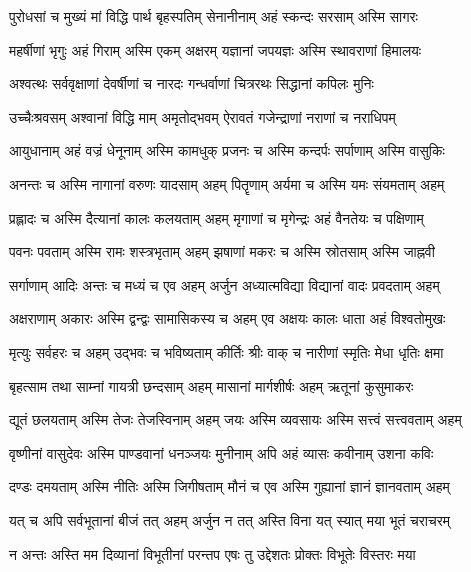 \twolineshloka
{पुरोधसां च मुख्यं मां विद्धि पार्थ बृहस्पतिम्}
{सेनानीनाम् अहं स्कन्दः सरसाम् अस्मि सागरः}%

\twolineshloka
{महर्षीणां भृगुः अहं गिराम् अस्मि एकम् अक्षरम्}
{यज्ञानां जपयज्ञः अस्मि स्थावराणां हिमालयः}%

\twolineshloka
{अश्वत्थः सर्ववृक्षाणां देवर्षीणां च नारदः}
{गन्धर्वाणां चित्ररथः सिद्धानां कपिलः मुनिः}%

\twolineshloka
{उच्चैःश्रवसम् अश्वानां विद्धि माम् अमृतोद्भवम्}
{ऐरावतं गजेन्द्राणां नराणां च नराधिपम्}%

\twolineshloka
{आयुधानाम् अहं वज्रं धेनूनाम् अस्मि कामधुक्}
{प्रजनः च अस्मि कन्दर्पः सर्पाणाम् अस्मि वासुकिः}%

\twolineshloka
{अनन्तः च अस्मि नागानां वरुणः यादसाम् अहम्}
{पितॄणाम् अर्यमा च अस्मि यमः संयमताम् अहम्}%

\twolineshloka
{प्रह्लादः च अस्मि दैत्यानां कालः कलयताम् अहम्}
{मृगाणां च मृगेन्द्रः अहं वैनतेयः च पक्षिणाम्}%

\twolineshloka
{पवनः पवताम् अस्मि रामः शस्त्रभृताम् अहम्}
{झषाणां मकरः च अस्मि स्रोतसाम् अस्मि जाह्नवी}%

\twolineshloka
{सर्गाणाम् आदिः अन्तः च मध्यं च एव अहम् अर्जुन}
{अध्यात्मविद्या विद्यानां वादः प्रवदताम् अहम्}%

\twolineshloka
{अक्षराणाम् अकारः अस्मि द्वन्द्वः सामासिकस्य च}
{अहम् एव अक्षयः कालः धाता अहं विश्वतोमुखः}%

\twolineshloka
{मृत्युः सर्वहरः च अहम् उद्भवः च भविष्यताम्}
{कीर्तिः श्रीः वाक् च नारीणां स्मृतिः मेधा धृतिः क्षमा}%

\twolineshloka
{बृहत्साम तथा साम्नां गायत्री छन्दसाम् अहम्}
{मासानां मार्गशीर्षः अहम् ऋतूनां कुसुमाकरः}%

\twolineshloka
{द्यूतं छलयताम् अस्मि तेजः तेजस्विनाम् अहम्}
{जयः अस्मि व्यवसायः अस्मि सत्त्वं सत्त्ववताम् अहम्}%

\twolineshloka
{वृष्णीनां वासुदेवः अस्मि पाण्डवानां धनञ्जयः}
{मुनीनाम् अपि अहं व्यासः कवीनाम् उशना कविः}%

\twolineshloka
{दण्डः दमयताम् अस्मि नीतिः अस्मि जिगीषताम्}
{मौनं च एव अस्मि गुह्यानां ज्ञानं ज्ञानवताम् अहम्}%

\twolineshloka
{यत् च अपि सर्वभूतानां बीजं तत् अहम् अर्जुन}
{न तत् अस्ति विना यत् स्यात् मया भूतं चराचरम्}%

\twolineshloka
{न अन्तः अस्ति मम दिव्यानां विभूतीनां परन्तप}
{एषः तु उद्देशतः प्रोक्तः विभूतेः विस्तरः मया}%

